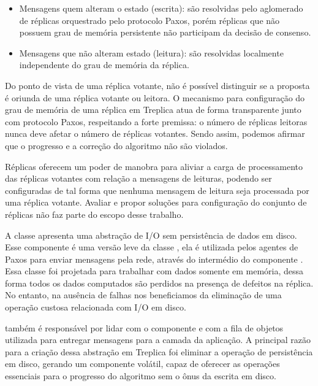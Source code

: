 \begin{itemize}
  \item Mensagens quem alteram o estado (escrita): são resolvidas pelo aglomerado de
    réplicas orquestrado pelo protocolo Paxos, porém réplicas que não possuem grau de
    memória persistente não participam da decisão de consenso.
  \item Mensagens que não alteram estado (leitura): são resolvidas localmente independente
    do grau de memória da réplica.
\end{itemize}

Do ponto de vista de uma réplica votante, não é possível distinguir se a proposta é
oriunda de uma réplica votante ou leitora. O mecanismo para configuração do grau de
memória de uma réplica em Treplica atua de forma transparente junto com protocolo Paxos,
respeitando a forte premissa: o número de réplicas leitoras nunca deve afetar o número de
réplicas votantes. Sendo assim, podemos afirmar que o progresso e a correção do algoritmo
não são violados.

Réplicas oferecem um poder de manobra para aliviar a carga de processamento das réplicas
votantes com relação a mensagens de leituras, podendo ser configuradas de tal forma que
nenhuma mensagem de leitura seja processada por uma réplica votante. Avaliar e propor
soluções para configuração do conjunto de réplicas não faz parte do escopo desse trabalho.


A classe  apresenta uma abstração de I/O sem persistência de
dados em disco. Esse componente é uma versão leve da classe , ela é
utilizada pelos agentes de Paxos para enviar mensagens pela rede, através do intermédio do
componente . Essa classe foi projetada para trabalhar com dados
somente em memória, dessa forma todos os dados computados são perdidos na presença de
defeitos na réplica. No entanto, na ausência de falhas nos beneficiamos da eliminação de
uma operação custosa relacionada com I/O em disco.

 também é responsável por lidar com o componente
 e com a fila de objetos utilizada para entregar mensagens para a camada
da aplicação. A principal razão para a criação dessa abstração em Treplica foi eliminar a
operação de persistência em disco, gerando um componente volátil, capaz de oferecer as
operações essenciais para o progresso do algoritmo sem o ônus da escrita em disco.

